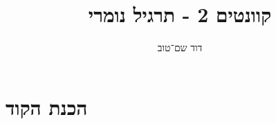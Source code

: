 \documentclass{article}
\title{קוונטים 2 - תרגיל נומרי}
\author{דוד שם־טוב}
\begin{document}
\maketitle

\section{הכנת הקוד}
\end{document}
